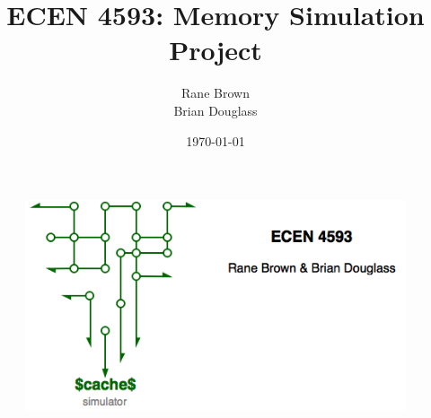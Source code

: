 \documentclass[11pt,titlepage]{article}
\author{Rane Brown \\ Brian Douglass}
\title{ECEN 4593: Memory Simulation Project}
\date{\today}
\begin{document}
\vspace*{\fill}
    \begin{figure}[H]
        \centering
        \includegraphics[scale=0.7]{../images/cache.png}
    \end{figure}
\vspace*{\fill}
\end{document}
